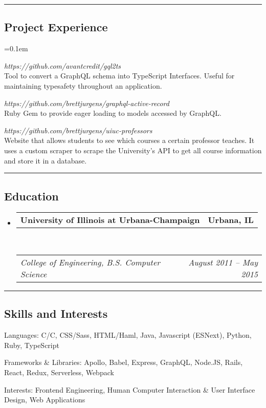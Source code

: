 \documentclass[10pt,letterpaper]{article}
\makeatletter
\newcommand{\headerrow}[2]
{\begin{tabular*}{\linewidth}{l@{\extracolsep{\fill}}r}
	#1 &
	#2 \\
\end{tabular*}}
\newcommand{\CPP}
{C\nolinebreak[4]\hspace{-.05em}\raisebox{.22ex}{\footnotesize\bf ++}}
\makeatother
\begin{document}
\hrule
\vspace{-0.4em}
\subsection*{Project Experience}
\begin{description}[leftmargin=0pt]
	\parskip=0.1em
	
        \item[gql2ts] {\emph{https://github.com/avantcredit/gql2ts}}\hfill\\
        Tool to convert a GraphQL schema into TypeScript Interfaces. Useful for 
        maintaining typesafety throughout an application.

	\item[GraphQL Active Record] 
	{\emph{https://github.com/brettjurgens/graphql-active-record}}\hfill\\
	Ruby Gem to provide eager loading to models accessed by GraphQL.

	\item[UIUC Professors] {\emph{https://github.com/brettjurgens/uiuc-professors}}\hfill\\
      Website that allows students to see which courses a certain professor
      teaches. It uses a custom scraper to scrape the University's API to get
      all course information and store it in a database.
\end{description}

\hrule
\vspace{-0.4em}
\subsection*{Education}

\begin{itemize}
	\parskip=0.1em

	\item
	\headerrow
		{\textbf{University of Illinois at Urbana-Champaign}}
		{\textbf{Urbana, IL}}
	\\
	\headerrow
		{\emph{College of Engineering, B.S. Computer Science}}
		{\emph{August 2011 -- May 2015}}

\end{itemize}


\hrule
\vspace{-0.4em}
\subsection*{Skills and Interests}

\begin{description*}
	\item[Languages:]
       C/\CPP, CSS/Sass, HTML/Haml, Java, Javascript (ESNext), Python, Ruby, TypeScript
	\item[Frameworks \& Libraries:]
	Apollo, Babel, Express, GraphQL, Node.JS, Rails, React, Redux, Serverless, Webpack
	\item[Interests:]
	Frontend Engineering, Human Computer Interaction \& User Interface Design, Web
	Applications
\end{description*}
\end{document}
